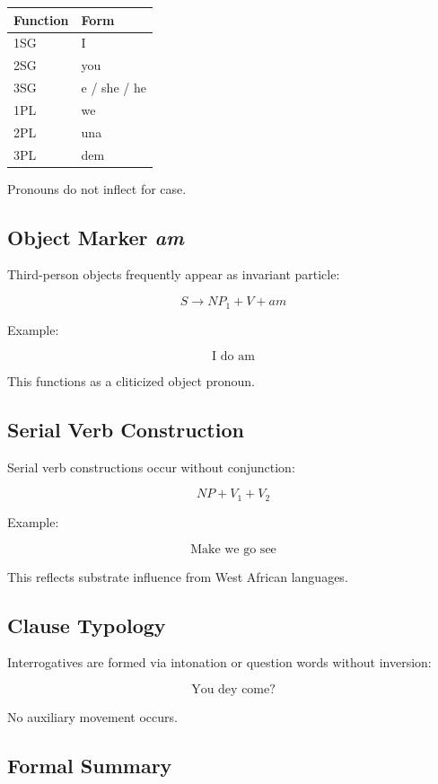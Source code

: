 \documentclass[12pt]{article}
\begin{document}
\begin{center}
\begin{tabular}{ll}
\textbf{Function} & \textbf{Form} \\ \hline
1SG & I \\
2SG & you \\
3SG & e / she / he \\
1PL & we \\
2PL & una \\
3PL & dem \\
\end{tabular}
\end{center}

Pronouns do not inflect for case.

\subsection{Object Marker \textit{am}}

Third-person objects frequently appear as invariant particle:

\[
S \rightarrow NP_1 + V + am
\]

Example:

\[
\text{I do am}
\]

This functions as a cliticized object pronoun.

\subsection{Serial Verb Construction}

Serial verb constructions occur without conjunction:

\[
NP + V_1 + V_2
\]

Example:

\[
\text{Make we go see}
\]

This reflects substrate influence from West African languages.

\subsection{Clause Typology}

Interrogatives are formed via intonation or question words without inversion:

\[
\text{You dey come?}
\]

No auxiliary movement occurs.

\subsection{Formal Summary}
\end{document}
